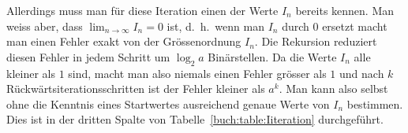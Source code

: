 Allerdings muss man für diese Iteration einen der Werte $I_n$ bereits
kennen.
Man weiss aber, dass $\lim_{n\to\infty} I_n=0$ ist, d.~h.~wenn man
$I_n$ durch $0$ ersetzt macht man einen Fehler exakt von der
Grössenordnung $I_n$.
Die Rekursion reduziert diesen Fehler in jedem Schritt um $\log_2a$
Binärstellen.
Da die Werte $I_n$ alle kleiner als $1$ sind, macht man also
niemals einen Fehler grösser als $1$ und nach $k$ Rückwärtsiterationsschritten
ist der Fehler kleiner als $a^k$.
%
Man kann also selbst ohne die Kenntnis eines Startwertes ausreichend
genaue Werte von $I_n$ bestimmen.
%
Dies ist in der dritten Spalte von Tabelle~\ref{buch:table:Iiteration}
durchgeführt.





